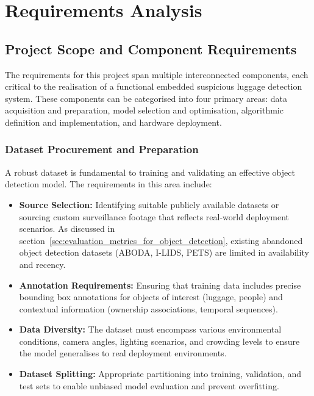 \section{Requirements Analysis}
\subsection{Project Scope and Component Requirements}

The requirements for this project span multiple interconnected components, each
critical to the realisation of a functional embedded suspicious luggage
detection system. These components can be categorised into four primary areas:
data acquisition and preparation, model selection and optimisation, algorithmic
definition and implementation, and hardware deployment.

\subsubsection{Dataset Procurement and Preparation}
\label{sec:requirements_dataset_procurement_preparation}

A robust dataset is fundamental to training and validating an effective object
detection model. The requirements in this area include:

\begin{itemize}
	\item \textbf{Source Selection:}\label{req:source_selection} Identifying suitable publicly available
	      datasets or sourcing custom surveillance footage that reflects
	      real-world deployment scenarios. As discussed in
	      section~\ref{sec:evaluation_metrics_for_object_detection}, existing
	      abandoned object detection datasets (ABODA, I-LIDS, PETS) are limited
	      in availability and recency.
	\item \textbf{Annotation Requirements:}\label{req:annotation} Ensuring that training data includes
	      precise bounding box annotations for objects of interest (luggage,
	      people) and contextual information (ownership associations, temporal
	      sequences).
	\item \textbf{Data Diversity:}\label{req:data_diversity} The dataset must encompass various
	      environmental conditions, camera angles, lighting scenarios, and
	      crowding levels to ensure the model generalises to real deployment
	      environments.
	\item \textbf{Dataset Splitting:}\label{req:dataset_splitting} Appropriate partitioning into training,
	      validation, and test sets to enable unbiased model evaluation and
	      prevent overfitting.
\end{itemize}

